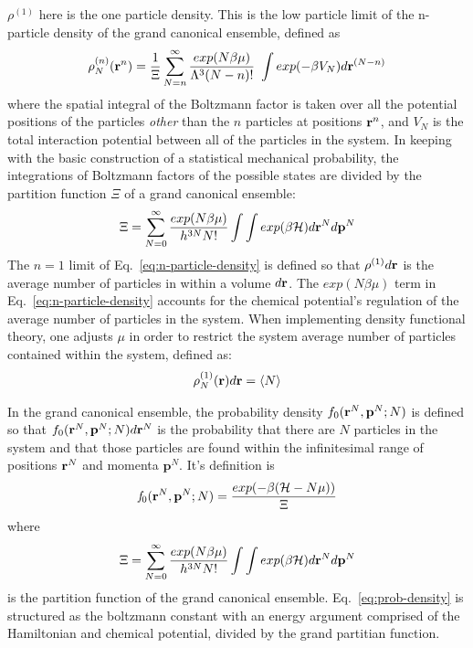 $\rho^{(1)}$ here is the one particle density.  This is the low particle
limit of the n-particle density of the grand canonical ensemble,
defined as
\begin{align}
  \label{eq:n-particle-density}
  \rho_N^{(n)}(\textbf{r}^n)=\frac{1}{\Xi}\sum^{\infty}_{N=n}\frac{exp(N\beta \mu)}{\Lambda^3 (N-n)!} \
  \int exp(-\beta V_N)d\textbf{r}^{(N-n)}
\end{align}
where the spatial integral of the Boltzmann factor is taken over all
the potential positions of the particles \emph{other} than the $n$
particles at positions $\textbf{r}^n$, and $V_N$ is the total interaction
potential between all of the particles in the system.  In keeping with
the basic construction of a statistical mechanical probability, the
integrations of Boltzmann factors of the possible states are divided
by the partition function $\Xi$ of a grand canonical ensemble:
\begin{align}
  \Xi = \sum_{N=0}^{\infty}\frac{exp(N\beta\mu)}{h^{3N}N!}\int\int exp(\beta \mathcal{H})d\textbf{r}^Nd\mathbf{p}^N
\end{align}
The $n=1$ limit of Eq.~\ref{eq:n-particle-density} is defined so that
$\rho^{(1)}d\textbf{r}$ is the average number of particles in within a volume
$d\textbf{r}$.  The $exp(N\beta \mu)$ term in Eq.~\ref{eq:n-particle-density}
accounts for the chemical potential's regulation of the average number
of particles in the system.  When implementing density functional
theory, one adjusts $\mu$ in order to restrict the system average
number of particles contained within the system, defined as:
\begin{align}
  \rho_N^{(1)}(\textbf{r})d\textbf{r} = \langle N \rangle
\end{align}


In the grand canonical ensemble, the probability density
$f_0(\textbf{r}^N,\mathbf{p}^N;N)$ is defined so that
$f_0(\textbf{r}^N,\mathbf{p}^N;N)d\textbf{r}^N$ is the probability that there are
$N$ particles in the system and that those particles are found within
the infinitesimal range of positions $\textbf{r}^N$ and momenta
$\mathbf{p}^N$.  It's definition is
\begin{align} \label{eq:prob-density}
  \mathit{f}_0(\textbf{r}^N,\mathbf{p}^N;N) = \frac{exp(-\beta(\mathcal{H}-N\mu))}{\Xi}
\end{align}
where
\begin{align}
  \Xi = \sum_{N=0}^{\infty}\frac{exp(N\beta\mu)}{h^{3N}N!}\int\int exp(\beta \mathcal{H})d\textbf{r}^Nd\mathbf{p}^N
\end{align}
is the partition function of the grand canonical
ensemble. Eq.~\ref{eq:prob-density} is structured as the boltzmann
constant with an energy argument comprised of the Hamiltonian and
chemical potential, divided by the grand partitian function.

